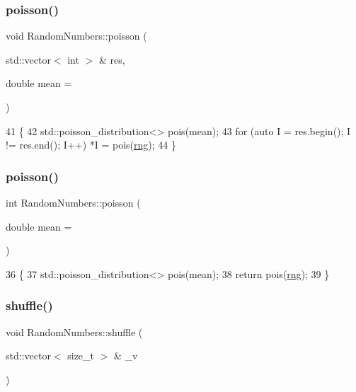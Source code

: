 \subsubsection{\texorpdfstring{poisson()}{poisson()}\hspace{0.1cm}{\footnotesize\ttfamily [1/2]}}
{\footnotesize\ttfamily void Random\+Numbers\+::poisson (\begin{DoxyParamCaption}\item[{std\+::vector$<$ int $>$ \&}]{res,  }\item[{double}]{mean = {} }\end{DoxyParamCaption})}


\begin{DoxyCode}
41                                                             \{
42     std::poisson\_distribution<> pois(mean);
43     \textcolor{keywordflow}{for} (\textcolor{keyword}{auto} I = res.begin(); I != res.end(); I++) *I = pois(\mbox{\hyperlink{classRandomNumbers_a15ceee85d6d00de12ae76c90aaec2f14}{rng}});
44 \}
\end{DoxyCode}
\mbox{\label{classRandomNumbers_ac5bd95dddabde62a74a0d871a66ce2f0}} 
\subsubsection{\texorpdfstring{poisson()}{poisson()}\hspace{0.1cm}{\footnotesize\ttfamily [2/2]}}
{\footnotesize\ttfamily int Random\+Numbers\+::poisson (\begin{DoxyParamCaption}\item[{double}]{mean = {} }\end{DoxyParamCaption})}


\begin{DoxyCode}
36                                       \{
37     std::poisson\_distribution<> pois(mean);
38     \textcolor{keywordflow}{return} pois(\mbox{\hyperlink{classRandomNumbers_a15ceee85d6d00de12ae76c90aaec2f14}{rng}});
39 \}
\end{DoxyCode}
\mbox{\label{classRandomNumbers_a851aaa7e46922dc22ce984b21b474a4e}} 
\subsubsection{\texorpdfstring{shuffle()}{shuffle()}}
{\footnotesize\ttfamily void Random\+Numbers\+::shuffle (\begin{DoxyParamCaption}\item[{std\+::vector$<$ size\+\_\+t $>$ \&}]{\+\_\+v }\end{DoxyParamCaption})\hspace{0.3cm}{\ttfamily [inline]}}

